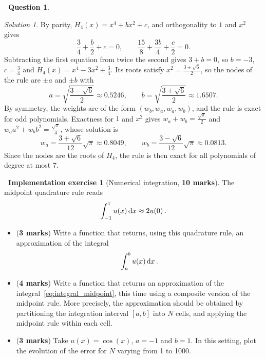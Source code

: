 \documentclass[10pt]{article}
\theoremstyle{definition}
\newtheorem{question}{{\normalfont \faGears}~Question}
\newtheorem{compexercise}{{\normalfont \faLaptop}~Implementation exercise}
\theoremstyle{remark}
\newtheorem*{protosolution}{Solution}
\renewcommand{\mymarks}[1]{\textbf{#1 marks}}
\newenvironment{solutionframe}
{%
    \begin{mdframed}[
        leftmargin=1cm,
        skipabove=.3cm,
        linecolor=blue,
        backgroundcolor=lightgreen,
        linewidth=0pt,
        innerleftmargin=.5em,
        innerrightmargin=.5em,
        innertopmargin=.3em,
        innerbottommargin=.6em,
    ]
}
{
    \end{mdframed}
}
\newenvironment{solution}
{\pushQED{\qed}\renewcommand{\qedsymbol}{$\triangle$}
\begin{solutionframe}\small \begin{protosolution}}
{\popQED\end{protosolution}\end{solutionframe}}
\begin{document}
\begin{question}
\begin{enumerate}
\begin{solution}
    By parity, $H_4(x) = x^4 + b x^2 + c$, and orthogonality to $1$ and $x^2$ gives
    \[
        \frac{3}{4} + \frac{b}{2} + c = 0,
        \qquad
        \frac{15}{8} + \frac{3b}{4} + \frac{c}{2} = 0.
    \]
    Subtracting the first equation from twice the second gives $3 + b = 0$,
    so $b = -3$, $c = \frac{3}{4}$ and
    \(
        H_4(x) = x^4 - 3 x^2 + \frac{3}{4}.
    \)
    Its roots satisfy $x^2 = \frac{3 \pm \sqrt{6}}{2}$,
    so the nodes of the rule are $\pm a$ and $\pm b$ with
    \[
        a = \sqrt{\frac{3 - \sqrt{6}}{2}} \approx 0.5246,
        \qquad
        b = \sqrt{\frac{3 + \sqrt{6}}{2}} \approx 1.6507.
    \]
    By symmetry, the weights are of the form $(w_b, w_a, w_a, w_b)$,
    and the rule is exact for odd polynomials.
    Exactness for $1$ and $x^2$ gives
    $w_a + w_b = \frac{\sqrt{\pi}}{2}$ and $w_a a^2 + w_b b^2 = \frac{\sqrt{\pi}}{4}$,
    whose solution is
    \[
        w_a = \frac{3 + \sqrt{6}}{12} \sqrt{\pi} \approx 0.8049,
        \qquad
        w_b = \frac{3 - \sqrt{6}}{12} \sqrt{\pi} \approx 0.0813.
    \]
    Since the nodes are the roots of $H_4$,
    the rule is then exact for all polynomials of degree at most 7.
\end{solution}
\end{enumerate}
\end{question}

\begin{compexercise}
    [Numerical integration, \mymarks{10}]
    The midpoint quadrature rule reads
    \[
        \int_{-1}^{1} u(x) \, \mathrm d x
        \approx 2 u(0) \, .
    \]
    \begin{itemize}
        \item
            (\mymarks{3})
            Write a function  that returns, using this quadrature rule,
            an approximation of the integral
            \begin{align}
                \label{eq:integral_midpoint}
                \int_{a}^{b} u(x) \, \mathrm d x \, .
            \end{align}

        \item
            (\mymarks{4})
            Write a function 
            that returns an approximation of the integral~\eqref{eq:integral_midpoint},
            this time using a composite version of the midpoint rule.
            More precisely, the approximation should be obtained
            by partitioning the integration interval $[a, b]$ into $N$ cells,
            and applying the midpoint rule within each cell.

        \item
            (\mymarks{3})
            Take $u(x) = \cos(x)$, $a = -1$ and $b = 1$.
            In this setting, plot the evolution of the error for $N$ varying from 1 to 1000.
    \end{itemize}
\end{compexercise}
\end{document}
